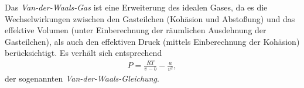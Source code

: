 \begin{summary}
    Das \emph{Van-der-Waals-Gas} ist eine Erweiterung des idealen Gases, da es die Wechselwirkungen zwischen den Gasteilchen (Kohäsion und Abstoßung) und das effektive Volumen (unter Einberechnung der räumlichen Ausdehnung der Gasteilchen), als auch den effektiven Druck (mittels Einberechnung der Kohäsion) berücksichtigt.
    Es verhält sich entsprechend 
    \begin{align*}
        P=\frac{RT}{v-b}-\frac{a}{v^2},
    \end{align*}
    der sogenannten \emph{Van-der-Waals-Gleichung}.
\end{summary}